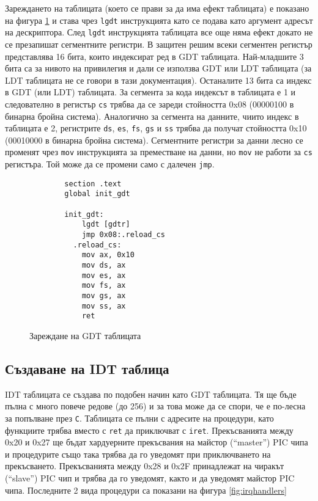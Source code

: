   Зареждането на таблицата (което се прави за да има ефект таблицата) е показано на фигура \ref{fig:lgdt} и става чрез {\tt lgdt} инструкцията като се подава като аргумент адресът на дескриптора. След {\tt lgdt} инструкцията таблицата все още няма ефект докато не се презапишат сегментните регистри. В защитен решим всеки сегментен регистър представлява 16 бита, които индексират ред в GDT таблицата. Най-младшите 3 бита са за нивото на привилегия и дали се използва GDT или LDT таблицата (за LDT таблицата не се говори в тази документация). Останалите 13 бита са индекс в GDT (или LDT) таблицата. За сегмента за кода индексът в таблицата е 1 и следователно в регистър {\tt cs} трябва да се зареди стойността 0x08 (00000100 в бинарна бройна система). Аналогично за сегмента на данните, чиито индекс в таблицата е 2, регистрите {\tt ds}, {\tt es}, {\tt fs}, {\tt gs} и {\tt ss} трябва да получат стойността 0x10 (00010000 в бинарна бройна система). Сегментните регистри за данни лесно се променят чрез {\tt mov} инструкцията за преместване на данни, но {\tt mov} не работи за {\tt cs} регистъра. Той може да се промени само с далечен {\tt jmp}.

    \begin{figure}[htpb]
      \centering
      \begin{verbatim}
        section .text
        global init_gdt

        init_gdt:
            lgdt [gdtr]
            jmp 0x08:.reload_cs
          .reload_cs:
            mov ax, 0x10
            mov ds, ax
            mov es, ax
            mov fs, ax
            mov gs, ax
            mov ss, ax
            ret
      \end{verbatim}
      \caption{Зареждане на GDT таблицата}
      \label{fig:lgdt}
    \end{figure}

  \subsection{Създаване на IDT таблица}
  IDT таблицата се създава по подобен начин като GDT таблицата. Тя ще бъде пълна с много повече редове (до 256) и за това може да се спори, че е по-лесна за попълване през {\tt C}. Таблицата се пълни с адресите на процедури, като функциите трябва вместо с {\tt ret} да приключват с {\tt iret}. Прекъсванията между 0x20 и 0x27 ще бъдат хардуерните прекъсвания на майстор (``master'') PIC чипа и процедурите също така трябва да го уведомят при приключването на прекъсването. Прекъсванията между 0x28 и 0x2F принадлежат на чиракът (``slave'') PIC чип и трябва да го уведомят, както и да уведомят майстор PIC чипа. Последните 2 вида процедури са показани на фигура \ref{fig:irqhandlers}

